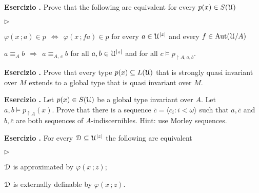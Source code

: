 \documentclass[10pt]{article}
\def\phi{\varphi}
\def\D{\EuScript D}
\def\U{\EuScript U}
\def\<{\langle}
\def\>{\rangle}
\def\IMP{\Rightarrow}
\def\IFF{\Leftrightarrow}
\def\Aut{\textrm{Aut}}
\newcommand{\labella}[1]{{\sf\footnotesize #1}\hfill}
\renewenvironment{itemize}
  {\begin{list}{$\triangleright$}{%
   \setlength{\parskip}{0mm}
   \setlength{\topsep}{0mm}
   \setlength{\rightmargin}{0mm}
   \setlength{\listparindent}{0mm}
   \setlength{\itemindent}{0mm}
   \setlength{\labelwidth}{3ex}
   \setlength{\itemsep}{0mm}
   \setlength{\parsep}{0mm}
   \setlength{\partopsep}{0mm}
   \setlength{\labelsep}{1ex}
   \setlength{\leftmargin}{\labelwidth+\labelsep}
   \let\makelabel\labella}}{%
   \end{list}}
\newcounter{ex}
\newenvironment{exercise}{\addtocounter{ex}{1}\textbf{Esercizio \theex.\quad}}{}
\begin{document}
 
\begin{exercise}
  Prove that the following are equivalent for every $p(x)\in S(\U)$
  \begin{itemize}
  \item[1.] $\phi(x\,;a)\in p\ \ \IFF\ \ \phi(x\,;fa)\in p$ for every $a\in\U^{|z|}$ and every $f\in\Aut(\U/A)$
  \item[2.] $a\equiv_Ab\ \ \IMP\ \ a\equiv_{A,\,c}b$ for all $a,b\in\U^{|z|}$ and for all $c\models p_{\restriction A,a,b}$.
  \end{itemize}
\end{exercise}


\begin{exercise}
  Prove that every type $p(x)\subseteq L(\U)$ that is strongly quasi invariant over $M$ extends to a global type that is quasi invariant over $M$.
\end{exercise}


\begin{exercise}
  Let  $p(x)\in S(\U)$ be a global type invariant over $A$.
  Let $a, b\models p_{\restriction A}(x)$.
  Prove that there is a sequence $\bar c=\<c_i:i<\omega\>$ such that $a,\bar c$ and $b,\bar c$ are both sequences of $A$-indiscernibles. Hint: use Morley sequences.
  \end{exercise}

  
\begin{exercise}
   For every $\D\subseteq\U^{|z|}$ the following are equivalent
   \begin{itemize}
   \item[1.] $\D$ is approximated by $\phi(x\,;z)$;
   \item[2.] $\D$ is externally definable by $\phi(x\,;z)$.
   \end{itemize}
\end{exercise}
  
\end{document}
